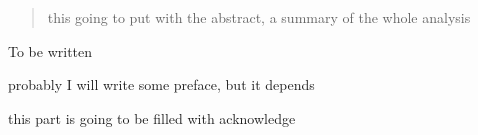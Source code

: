 \documentclass[final,numrefs,sort&compress,twoadvisors]{nddiss2e}
\begin{document}
\begin{abstract}
  this going to put with the abstract, a summary of the whole analysis 
\end{abstract}

\renewcommand{\dedicationname}{NEW DEDICATION NAME}

\begin{dedication}
  To be written
\end{dedication}

\tableofcontents
\listoffigures
\listoftables

\begin{preface}
probably I will write some preface, but it depends   \Hmuhad
\end{preface}

\begin{acknowledge}
 this part is going to be filled with acknowledge
\end{acknowledge}


\mainmatter
%

%
%
\end{document}
